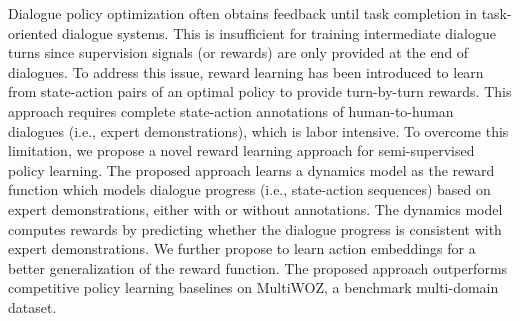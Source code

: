 Dialogue policy optimization often obtains feedback until task completion in task-oriented dialogue systems. This is insufficient for training intermediate dialogue turns since supervision signals (or rewards) are only provided at the end of dialogues. To address this issue, reward learning has been introduced to learn from state-action pairs of an optimal policy to provide turn-by-turn rewards. This approach requires complete state-action annotations of human-to-human dialogues (i.e., expert demonstrations), which is labor intensive. To overcome this limitation, we propose a novel reward learning approach for semi-supervised policy learning. The proposed approach learns a dynamics model as the reward function which models dialogue progress (i.e., state-action sequences) based on expert demonstrations, either with or without annotations. The dynamics model computes rewards by predicting whether the dialogue progress is consistent with expert demonstrations. We further propose to learn action embeddings for a better generalization of the reward function. The proposed approach outperforms competitive policy learning baselines on MultiWOZ, a benchmark multi-domain dataset.
